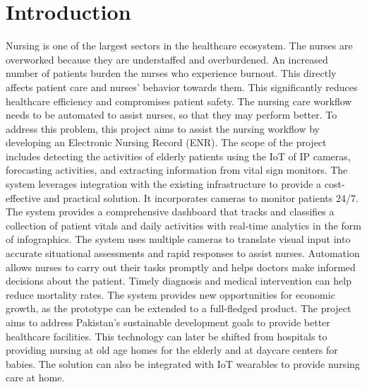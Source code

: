 
\chapter{Introduction} %
\label{Chapter1}
Nursing is one of the largest sectors in the healthcare ecosystem. The nurses are overworked because they are understaffed and overburdened. An increased number of patients burden the nurses who experience burnout. This directly affects patient care and nurses’ behavior towards them. This significantly reduces healthcare efficiency and compromises patient safety. The nursing care workflow needs to be automated to assist nurses, so that they may perform better. To address this problem, this project aims to assist the nursing workflow by developing an Electronic Nursing Record (ENR). The scope of the project includes detecting the activities of elderly patients using the IoT of IP cameras, forecasting activities, and extracting information from vital sign monitors. The system leverages integration with the existing infrastructure to provide a cost-effective and practical solution. It incorporates cameras to monitor patients 24/7. The system provides a comprehensive dashboard that tracks and classifies a collection of patient vitals and daily activities with real-time analytics in the form of infographics. The system uses multiple cameras to translate visual input into accurate situational assessments and rapid responses to assist nurses. Automation allows nurses to carry out their tasks promptly and helps doctors make informed decisions about the patient. Timely diagnosis and medical intervention can help reduce mortality rates. The system provides new opportunities for economic growth, as the prototype can be extended to a full-fledged product. The project aims to address Pakistan’s sustainable development goals to provide better healthcare facilities. This technology can later be shifted from hospitals to providing nursing at old age homes for the elderly and at daycare centers for babies. The solution can also be integrated with IoT wearables to provide nursing care at home.
